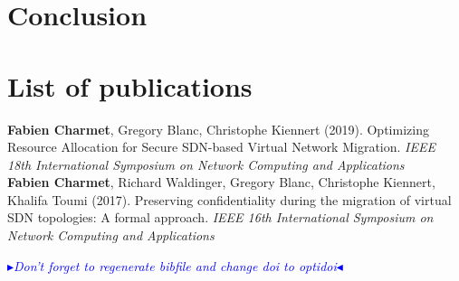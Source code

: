 \documentclass[a4paper, 11pt]{report}
\newcommand{\boxedtext}[1]{\fbox{\scriptsize\bfseries\textsf{#1}}}
\newcommand{\myremark}[2]{
   \textcolor{blue}{\boxedtext{#1}
      {\small$\blacktriangleright$\emph{\textsl{#2}}$\blacktriangleleft$}
}}
\newcommand\FC[1]{\myremark{FC}{#1}}
\theoremstyle{definition}
\begin{document}
\chapter{Conclusion}


\newpage
\chapter*{List of publications}
\textbf{Fabien Charmet}, Gregory Blanc, Christophe Kiennert (2019). Optimizing Resource Allocation for Secure SDN-based Virtual Network Migration. \textit{IEEE 18th International Symposium on Network Computing and Applications}\\

\textbf{Fabien Charmet}, Richard Waldinger, Gregory Blanc, Christophe Kiennert, Khalifa Toumi (2017). Preserving confidentiality during the migration of virtual SDN topologies: A formal approach. \textit{IEEE 16th International Symposium on Network Computing and Applications}

\newpage
\FC{Don't forget to regenerate bibfile and change doi to optidoi}
{}


\newpage
\begin{appendices}

\newpage
% 
\newpage

\end{appendices}
\end{document}
